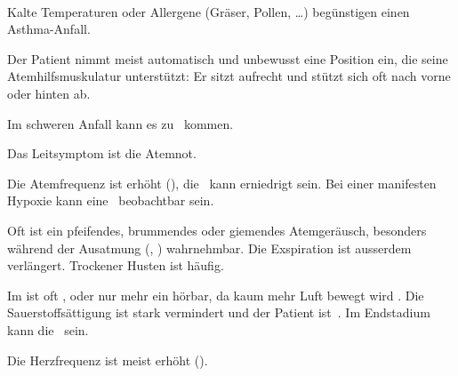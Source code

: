 \documentclass[
ngerman,
paper=a4,
asymmetric,
fontsize=10pt,
draft=false,
numbers=noenddot,
bibtotocnumbered,
footnotes=multiple,
]{scrreprt}
\newcommand{\jNEU}{\vspace{6pt}\noindent{\color{green}\sffamily\textbf{ADDED}\hrulefill\newline}}
\newcommand{\RedFlag}{{\color{DefaultRed}\scriptsize{\VarFlag}\hspace{-0.5em}}}
\begin{document}
\jNEU
 \TextSlide
{\TxABCDE}
{~
\begin{ABCDEText}
  \item[\ABCDE{1}] Kalte Temperaturen oder Allergene
  (Gräser, Pollen, \ldots) begünstigen einen Asthma-Anfall.
  \item[\ABCDE{2}] Der Patient nimmt meist automatisch und unbewusst eine
  Position ein, die seine Atemhilfsmuskulatur unterstützt: Er
  sitzt aufrecht und stützt sich oft nach vorne oder hinten
  ab.
  \item[\ABCDE{3}] Im schweren Anfall kann es zu
  {\RedFlag}\, kommen.
  \item[\ABCDE{4}] Das Leitsymptom ist die Atemnot.
  \item[\ABCDE{B}] Die Atemfrequenz ist erhöht
  (), die {\RedFlag}\,
  kann erniedrigt sein. Bei einer manifesten Hypoxie kann eine
  {\RedFlag}\, beobachtbar sein.
  
  Oft ist ein pfeifendes,
  brummendes oder giemendes Atemgeräusch, besonders während
  der Ausatmung (, ) wahrnehmbar. Die Exspiration ist ausserdem
  verlängert. Trockener Husten ist häufig.
  
  
  Im  ist oft , oder nur mehr ein
   hörbar, da kaum mehr Luft bewegt
  wird . Die
  {\RedFlag}\,Sauerstoffsättigung ist stark vermindert und der
  Patient ist {\RedFlag}\,. Im Endstadium kann
  die {\RedFlag}\, sein.
  \item[\ABCDE{C}] Die Herzfrequenz ist meist erhöht
  ().
  
  
  \item[\ABCDE{D}]
  \item[\ABCDE{E}]
  \item[\ABCDE{\ldots}]
  \item[\ABCDE{=}]
\end{ABCDEText}
}
\end{document}
